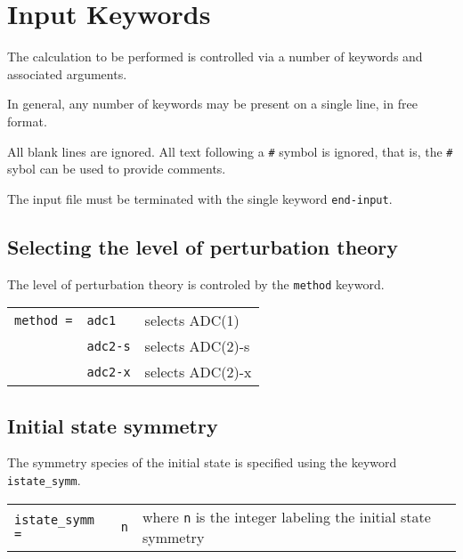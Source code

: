 \documentclass[12pt]{article}
\newcommand*\code[1]{\mbox{\texttt{{#1}}}} %
\begin{document}
\section*{Input Keywords}

\noindent
The calculation to be performed is controlled via a number of keywords
and associated arguments.

\vspace{0.2cm}
\noindent
In general, any number of keywords may be present on a single line, in
free format.

\vspace{0.2cm}
\noindent
All blank lines are ignored. All text following a \code{\#} symbol is
ignored, that is, the \code{\#} sybol can be used to provide
comments.

\vspace{0.2cm}
\noindent
The input file must be terminated with the single keyword
\code{end-input}.

\subsection*{Selecting the level of perturbation theory}
\noindent
The level of perturbation theory is controled by the \code{method} keyword.

\begin{table}[h]
\vspace*{1.7ex}
\begin{center}
\begin{tabular}{llp{2.5in}}
\code{method =} & \code{adc1}   & selects ADC(1) \\
                & \code{adc2-s} & selects ADC(2)-s \\
                & \code{adc2-x} & selects ADC(2)-x \\
\end{tabular}
\end{center}
\end{table}

\subsection*{Initial state symmetry}
\noindent
The symmetry species of the initial state is specified using the
keyword \code{istate\_symm}.

\begin{table}[h]
\vspace*{1.7ex}
\begin{center}
\begin{tabular}{llp{2.5in}}
\code{istate\_symm =} & \code{n}   & where \code{n} is the integer labeling the initial state symmetry \\
\end{tabular}
\end{center}
\end{table}
\end{document}

